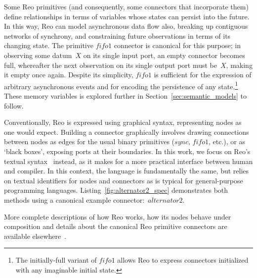 Some Reo primitives (and consequently, some connectors that incorporate them) define relationships in terms of variables whose states can persist into the future. In this way, Reo can model asynchronous data flow also, breaking up contiguous networks of synchrony, and constraining future observations in terms of its changing state. The primitive $fifo1$ connector is canonical for this purpose; in observing some datum~$X$ on its single input port, an empty connector becomes full, whereafter the next observation on its single output port must be~$X$, making it empty once again. Despite its simplicity, $fifo1$ is sufficient for the expression of arbitrary asynchronous events and for encoding the persistence of any state.\footnote{The initially-full variant of $fifo1$ allows Reo to express connectors initialized with any imaginable initial state.} These memory variables is explored further in Section~\ref{sec:semantic_models} to follow.

Conventionally, Reo is expressed using graphical syntax, representing nodes as one would expect. Building a connector graphically involves drawing connections between nodes as edges for the usual binary primitives ($sync$, $fifo1$, etc.), or as `black boxes', exposing ports at their boundaries. In this work, we focus on Reo's textual syntax~\cite{dokter2018treo} instead, as it makes for a more practical interface between human and compiler. In this context, the language is fundamentally the same, but relies on textual identifiers for nodes and connectors as is typical for general-purpose programming languages. Listing~\ref{fig:alternator2_spec} demonstrates both methods using a canonical example connector:~$alternator2$.

More complete descriptions of how Reo works, how its nodes behave under composition and details about the canonical Reo primitive connectors are available elsewhere~\cite{arbab2004modeling, arbab2005abstract, arbab2011puff}.



